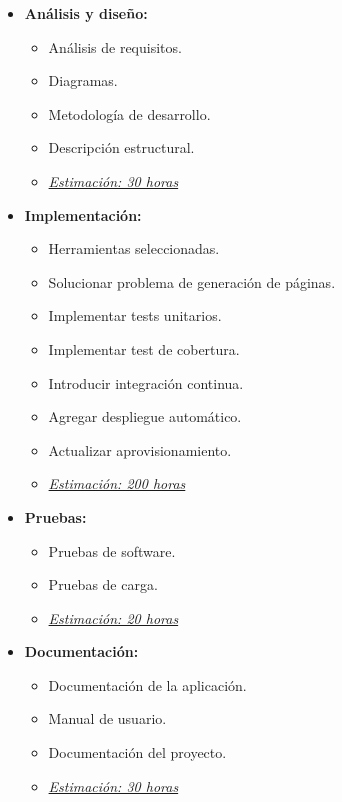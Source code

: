 \begin{itemize}
   \item \textbf{Análisis y diseño:}
   \begin{itemize}
    \item Análisis de requisitos.
    \item Diagramas.
    \item Metodología de desarrollo.
    \item Descripción estructural.
    \item \underline{\textit{Estimación: 30 horas}}
   \end{itemize}
\end{itemize}

\begin{itemize}
 \item \textbf{Implementación:}
 \begin{itemize}
  \item Herramientas seleccionadas.
  \item Solucionar problema de generación de páginas.
  \item Implementar tests unitarios.
  \item Implementar test de cobertura.
  \item Introducir integración continua.
  \item Agregar despliegue automático.
  \item Actualizar aprovisionamiento.
  \item \underline{\textit{Estimación: 200 horas}}
 \end{itemize}
\end{itemize}

\newpage
\begin{itemize}
 \item \textbf{Pruebas:}
 \begin{itemize}
  \item Pruebas de software.
  \item Pruebas de carga.
  \item \underline{\textit{Estimación: 20 horas}}
 \end{itemize}
\end{itemize}

\begin{itemize}
 \item \textbf{Documentación:}
 \begin{itemize}
  \item Documentación de la aplicación.
  \item Manual de usuario.
  \item Documentación del proyecto.
  \item \underline{\textit{Estimación: 30 horas}}
 \end{itemize}
\end{itemize}

